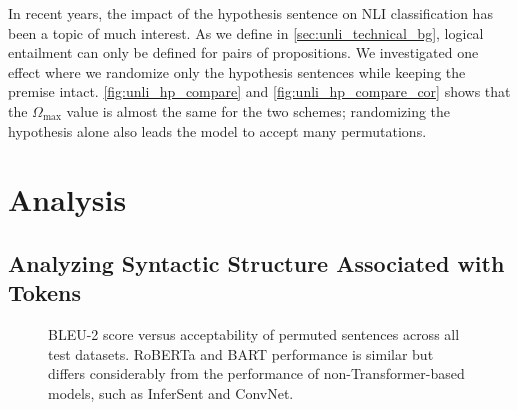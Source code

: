 \documentclass[letterpaper, 12pt]{report}
\begin{document}
In recent years, the impact of the hypothesis sentence \citep{gururangan-etal-2018-annotation, tsuchiya-2018-performance, poliak-etal-2018-hypothesis} on NLI classification has been a topic of much interest. As we define in \autoref{sec:unli_technical_bg}, logical entailment can only be defined for pairs of propositions. We investigated one effect where we randomize only the hypothesis sentences while keeping the premise intact. \autoref{fig:unli_hp_compare} and \autoref{fig:unli_hp_compare_cor} shows that the $\Omega_{\text{max}}$ value is almost the same for the two schemes; randomizing the hypothesis alone also leads the model to accept many permutations.


\section{Analysis}

\subsection{Analyzing Syntactic Structure Associated with Tokens}
\label{sec:unli_pos_mini_tree}


\begin{figure}[t]
    \centering
    \caption{BLEU-2 score versus acceptability of permuted sentences across all test datasets. RoBERTa and BART performance is similar but differs considerably from the performance of non-Transformer-based models, such as InferSent and ConvNet. }
    \label{fig:bleu_2}
\end{figure}
\end{document}

